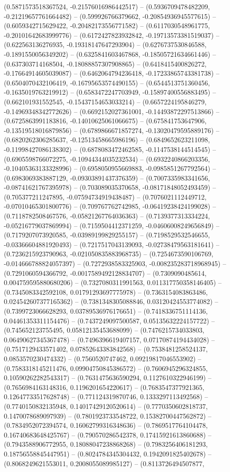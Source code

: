 (0.5871573518367524, -0.21576016986442517) -- (0.5936709478482209, -0.21219657761664482) -- (0.599926766379662, -0.20854936945577615) -- (0.6059342715629422, -0.20482173556771582) -- (0.6117030548961775, -0.20101642683999776) -- (0.6172427823932842, -0.19713573381519037) -- (0.622563136276935, -0.19318147647293904) -- (0.6276737530846588, -0.1891550056349202) -- (0.6325841603467868, -0.18505721634661446) -- (0.637303714168504, -0.18088857307908865) -- (0.6418415400826272, -0.17664914605039087) -- (0.6462064794236418, -0.17233865743381738) -- (0.6504070432106419, -0.16795653574490155) -- (0.6544513751360456, -0.1635019763219912) -- (0.6583472247703949, -0.15897400556883495) -- (0.662101931552545, -0.15437154653033214) -- (0.6657224195846279, -0.14969348342772626) -- (0.6692152027361001, -0.14493872297513866) -- (0.6725863991183816, -0.14010625061066675) -- (0.675841753647906, -0.13519518016879856) -- (0.6789866671857274, -0.13020479595889176) -- (0.6820262306285637, -0.12513458665986196) -- (0.6849652623211098, -0.11998427086138302) -- (0.6878083472462585, -0.1147538144514545) -- (0.6905598766072275, -0.10944344035232534) -- (0.6932240866203356, -0.10405363133328996) -- (0.6958050955669883, -0.0985851267792564) -- (0.6983069383887129, -0.09303891437376359) -- (0.7007335983341656, -0.08741621767395978) -- (0.703089035370658, -0.08171848052493459) -- (0.705377211247895, -0.07594734919438487) -- (0.7076021112449712, -0.07010465301800776) -- (0.709767762742985, -0.06419238424199028) -- (0.7118782508467576, -0.05821267764036363) -- (0.7139377313334224, -0.05216779037869994) -- (0.7159504412371259, -0.04606008249656849) -- (0.7179207073920585, -0.03989199829255157) -- (0.7198529532546655, -0.03366604881920493) -- (0.7217517043139093, -0.02738479563181641) -- (0.7236215923790963, -0.021050835883968735) -- (0.7254673590106769, -0.014666788824057397) -- (0.7272938583325903, -0.008235283718968945) -- (0.7291060594366792, -0.0017589492128834707) -- (0.7309090485614, 0.004759595880680206) -- (0.7327080311991563, 0.011317750358146405) -- (0.7345083342592108, 0.01791293697775978) -- (0.7363154083863486, 0.024542607377165362) -- (0.7381348305088846, 0.03120424553774082) -- (0.7399723066628293, 0.03789536976176651) -- (0.7418336751114136, 0.04461353311154476) -- (0.7437249097500587, 0.05135632224157722) -- (0.745652123755495, 0.05812135453688099) -- (0.7476215734033803, 0.06490627345367478) -- (0.7496396619407157, 0.07170874194434028) -- (0.7517129433571402, 0.07852643383842568) -- (0.7538481258524137, 0.0853570230474332) -- (0.7560520747462, 0.09219817046553902) -- (0.7583318145211476, 0.09904750845386572) -- (0.7606945296324855, 0.10590262282543317) -- (0.7631475636590294, 0.1127610322946199) -- (0.7656984163148316, 0.1196201654220617) -- (0.7683547377921365, 0.12647733517628748) -- (0.771124319870746, 0.1333297113492568) -- (0.7740150832135948, 0.14017429120520614) -- (0.7770350602818737, 0.1470078689097939) -- (0.7801923733548722, 0.15382700447562872) -- (0.7834952072394574, 0.16062799316348636) -- (0.7869517764104478, 0.16740683648425767) -- (0.790570286542378, 0.17415921613860688) -- (0.7943588906772955, 0.18088047238868268) -- (0.7983256406181293, 0.18756558845447951) -- (0.8024784345304432, 0.1942091825402678) -- (0.8068249621553011, 0.2008055089985127) -- (0.8113726494507877, 